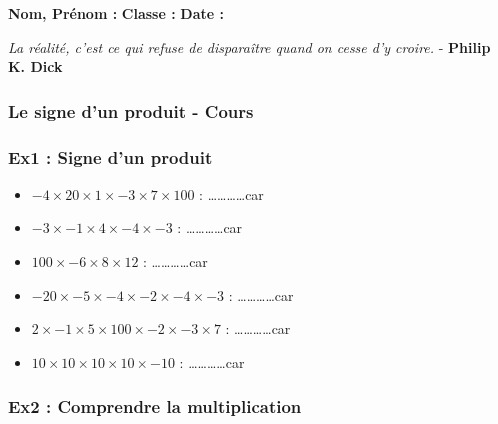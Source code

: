 



\textbf{Nom, Prénom :} \hspace{8cm} \textbf{Classe :} \hspace{3cm} \textbf{Date :}\\

\begin{center}
  \textit{La réalité, c'est ce qui refuse de disparaître quand on cesse d'y croire.}  - \textbf{Philip K. Dick}
\end{center}

\subsubsection*{Le signe d'un produit - Cours}

\Pointilles[5]

\subsubsection*{Ex1 : Signe d'un produit}

\begin{itemize}[label={$\bullet$}]
  \item $- 4 \times 20 \times 1 \times -3 \times 7 \times 100 $ : \ldots\ldots\ldots\ldots car \dotfill
  \item $-3 \times -1 \times 4 \times -4 \times -3 $ : \ldots\ldots\ldots\ldots car \dotfill
  \item $100 \times -6 \times 8 \times 12 $  : \ldots\ldots\ldots\ldots car \dotfill 
  \item $-20 \times -5 \times -4 \times -2 \times -4 \times -3$ : \ldots\ldots\ldots\ldots car \dotfill
  \item $2 \times -1 \times 5 \times 100 \times -2 \times -3 \times 7$ : \ldots\ldots\ldots\ldots car \dotfill
  \item $10 \times 10 \times 10 \times 10 \times -10 $  : \ldots\ldots\ldots\ldots car \dotfill
\end{itemize}

\subsubsection*{Ex2 : Comprendre la multiplication}

